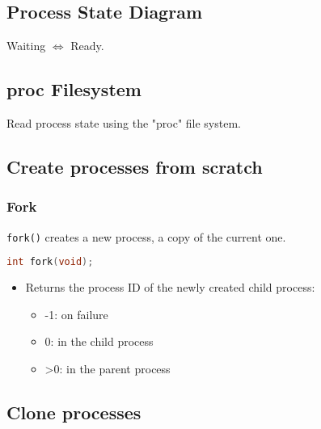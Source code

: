 \subsection{Process State Diagram}
\begin{definition}
\end{definition}

\begin{notes}
    Waiting $\iff$ Ready.
\end{notes}

\subsection{proc Filesystem}
\begin{definition}
    Read process state using the "proc" file system.
\end{definition}

\subsection{Create processes from scratch}

\subsubsection{Fork}
\begin{definition}
    \texttt{fork()} creates a new process, a copy of the current one.
\begin{lstlisting}[language=C]
int fork(void);
\end{lstlisting}
        
    \begin{itemize}
        \item Returns the process ID of the newly created child process:
        \begin{itemize}
            \item -1: on failure
            \item 0: in the child process
            \item >0: in the parent process
        \end{itemize}
    \end{itemize}
        
\end{definition}

\subsection{Clone processes}


